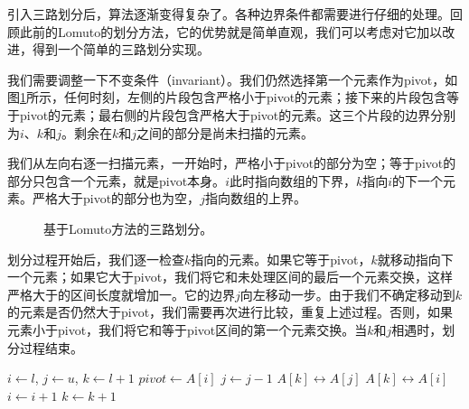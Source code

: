\documentclass[UTF8]{article}
\begin{document}
引入三路划分后，算法逐渐变得复杂了。各种边界条件都需要进行仔细的处理。回顾此前的Lomuto的划分方法，它的优势就是简单直观，我们可以考虑对它加以改进，得到一个简单的三路划分实现。

我们需要调整一下不变条件（invariant）。我们仍然选择第一个元素作为pivot，如图\ref{fig:partition-3-way-lomuto}所示，任何时刻，左侧的片段包含严格小于pivot的元素；接下来的片段包含等于pivot的元素；最右侧的片段包含严格大于pivot的元素。这三个片段的边界分别为$i$、$k$和$j$。剩余在$k$和$j$之间的部分是尚未扫描的元素。

我们从左向右逐一扫描元素，一开始时，严格小于pivot的部分为空；等于pivot的部分只包含一个元素，就是pivot本身。$i$此时指向数组的下界，$k$指向$i$的下一个元素。严格大于pivot的部分也为空，$j$指向数组的上界。

\begin{figure}[htbp]
   \centering
   \caption{基于Lomuto方法的三路划分。}
   \label{fig:partition-3-way-lomuto}
\end{figure}

划分过程开始后，我们逐一检查$k$指向的元素。如果它等于pivot，$k$就移动指向下一个元素；如果它大于pivot，我们将它和未处理区间的最后一个元素交换，这样严格大于的区间长度就增加一。它的边界$j$向左移动一步。由于我们不确定移动到$k$的元素是否仍然大于pivot，我们需要再次进行比较，重复上述过程。否则，如果元素小于pivot，我们将它和等于pivot区间的第一个元素交换。当$k$和$j$相遇时，划分过程结束。

\begin{algorithmic}[1]
    \State $i \gets l$, $j \gets u$, $k \gets l + 1$
    \State $pivot \gets A[i]$
        \State $j \gets j - 1$
        \State {} $A[k] \leftrightarrow A[j]$
      \EndWhile
        \State {} $A[k] \leftrightarrow A[i]$
        \State $i \gets i + 1$
      \EndIf
      \State $k \gets k + 1$
    \EndWhile
    \State {}
    \State {}
  \EndIf
\EndProcedure
\end{algorithmic}
\end{document}
